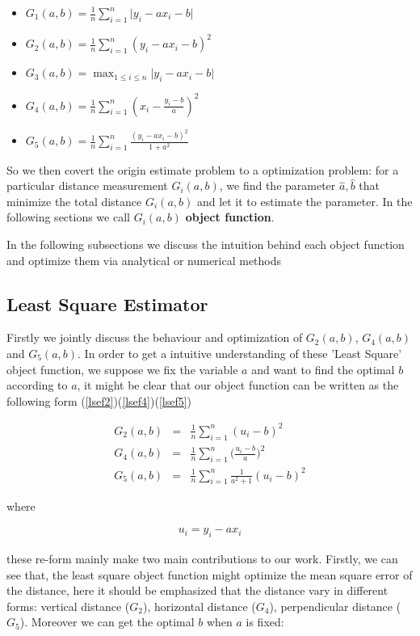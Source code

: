 \documentclass[twoside]{article}
\begin{document}
\begin{itemize}
  \item $G_1(a,b)=\frac{1}{n}\sum_{i=1}^n{\lvert y_i - a x_i - b\rvert}$
  \item $G_2(a,b)=\frac{1}{n}\sum_{i=1}^n{(y_i- a x_i - b)^2}$
  \item $G_3(a,b)=\max_{1 \le i\le n}{\lvert y_i - a x_i - b\rvert}$
  \item $G_4(a,b)=\frac{1}{n}\sum_{i=1}^n{(x_i-\frac{y_i-b}{a})^2}$
  \item $G_5(a,b)=\frac{1}{n}\sum_{i=1}^n{\frac{(y_i-a x_i - b)^2}{1+a^2}}$
\end{itemize}

So we then covert the origin estimate problem to a optimization problem: for a particular distance measurement $G_i(a,b)$, we find the parameter $\hat{a}, \hat{b}$ that minimize the total distance $G_i(a,b)$ and let it to estimate the parameter. In the following sections we call $G_i(a,b)$ \textbf{object function}.

In the following subsections we discuss the intuition behind each object function and optimize them via analytical or numerical methods

\subsection{Least Square Estimator}

Firstly we jointly discuss the behaviour and optimization of $G_2(a,b)$, $G_4(a,b)$ and $G_5(a,b)$. In order to get a intuitive understanding of these 'Least Square' object function, we suppose we fix the variable $a$ and want to find the optimal $b$ according to $a$, it might be clear that our object function can be written as the following form (\ref{lsef2})(\ref{lsef4})(\ref{lsef5})

\begin{eqnarray}
\label{lsef2}
G_2(a,b) &=& \frac{1}{n} \sum_{i=1}^n{(u_i - b)^2} \\
\label{lsef4}
G_4(a,b) &=& \frac{1}{n} \sum_{i=1}^n{\big(\frac{u_i - b}{a}\big)^2} \\
\label{lsef5}
G_5(a,b) &=& \frac{1}{n} \sum_{i=1}^n{\frac{1}{a^2+1}(u_i-b)^2}
\end{eqnarray}

where 

\begin{eqnarray}
u_i = y_i - a x_i
\end{eqnarray}

these re-form mainly make two main contributions to our work. Firstly, we can see that, the least square object function might optimize the mean square error of the distance, here it should be emphasized that the distance vary in different forms: vertical distance ($G_2$), horizontal distance ($G_4$), perpendicular distance ($G_5$). Moreover we can get the optimal $b$ when $a$ is fixed:
\end{document}
